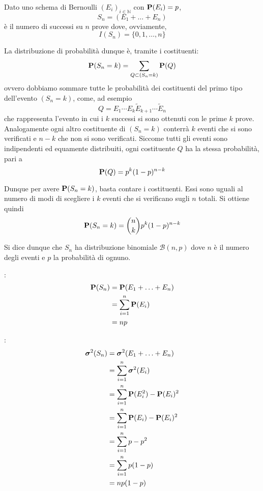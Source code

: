 Dato uno schema di Bernoulli \( (E_i)_{i \in \mathbb{N}} \) con \( \mathbf{P}(E_i) = p \),
\[ S_n = (E_1 + \ldots + E_n) \]
è il numero di successi su $n$ prove dove, ovviamente,
\[ I(S_n) = \{0,1, \ldots, n\} \]

La distribuzione di probabilità dunque è, tramite i costituenti:
\[ \mathbf{P}(S_n = k) = \sum_{Q \subset (S_n = k)} \mathbf{P}(Q) \]
ovvero dobbiamo sommare tutte le probabilità dei costituenti del primo tipo dell'evento \( (S_n = k) \), come, ad esempio
\[ Q = E_1 \cdots E_k \tilde{E}_{k+1} \cdots \tilde{E}_n \]
che rappresenta l'evento in cui i $k$ successi si sono ottenuti con le prime $k$ prove.
Analogamente ogni altro costituente di \( (S_n = k) \) conterrà $k$ eventi che si sono verificati e \( n-k \) che non si sono verificati.
Siccome tutti gli eventi sono indipendenti ed equamente distribuiti, ogni costituente $Q$ ha la stessa probabilità, pari a
\[ \mathbf{P}(Q) = p^k (1-p)^{n-k} \]

Dunque per avere \( \mathbf{P}(S_n = k) \), basta contare i costituenti.
Essi sono uguali al numero di modi di scegliere i $k$ eventi che si verificano sugli $n$ totali. Si ottiene quindi
\[
  \mathbf{P}(S_n = k) = \binom{n}{k} p^k (1-p)^{n-k} 
\]

Si dice dunque che \( S_n \) ha distribuzione binomiale \( \mathcal{B}(n, p) \) dove $n$ è il numero degli eventi e $p$ la probabilità di ognuno.

:
\begin{align*}
  \mathbf{P}(S_n) &= \mathbf{P}(E_1 + \ldots + E_n) \\
  &= \sum_{i=1}^n \mathbf{P}(E_i) \\
  &= np
\end{align*}

:
\begin{align*}
  \boldsymbol\sigma^2(S_n) &= \boldsymbol\sigma^2(E_1 + \ldots + E_n) \\
  &= \sum_{i = 1}^n \boldsymbol\sigma^2(E_i) \\
  &= \sum_{i = 1}^n \mathbf{P}(E_i^2) - \mathbf{P}(E_i)^2 \\
  &= \sum_{i = 1}^n \mathbf{P}(E_i) - \mathbf{P}(E_i)^2 \\
  &= \sum_{i = 1}^n p - p^2 \\
  &= \sum_{i = 1}^n p (1 - p) \\
  &= n p (1 - p)
\end{align*}



